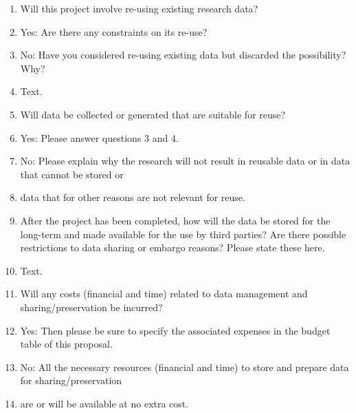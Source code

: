 \begin{enumerate}
    \item Will this project involve re-using existing research data?
    \item[] \checkedbox[1em] Yes: Are there any constraints on its re-use?
    \item[] \checkbox[1em] No: Have you considered re-using existing data but discarded the possibility? Why?
    \vspace{6pt}
    
    
    \item[] Text.
    \vspace{6pt}
    
    \item Will data be collected or generated that are suitable for reuse?
    \item[] \checkedbox[1em] Yes: Please answer questions 3 and 4.
    \item[] \checkbox[1em] No: Please explain why the research will not result in reusable data or in data that cannot be stored or
    \item[] \hspace*{3.4em}data that for other reasons are not relevant for reuse. 
    \vspace{6pt}
    
    \item After the project has been completed, how will the data be stored for the long-term and made available for the use by third parties? Are there possible restrictions to data sharing or embargo reasons? Please state these here.%
    \vspace{6pt}
    
    \item[] Text.
    \vspace{6pt}
    
    \item Will any costs (financial and time) related to data management and sharing/preservation be incurred?
    \item[] \checkbox[1em] Yes: Then please be sure to specify the associated expenses in the budget table of this proposal.
    \item[] \checkedbox[1em] No: All the necessary resources (financial and time) to store and prepare data for sharing/preservation
    \item[] \hspace*{3.4em}are or will be available at no extra cost.
\end{enumerate}


